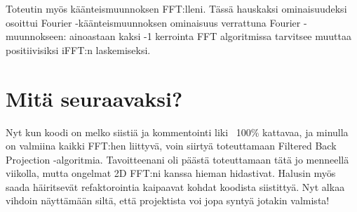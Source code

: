 \documentclass[12pt,a4paper]{report}
\begin{document}
    Toteutin myös käänteismuunnoksen FFT:lleni. Tässä hauskaksi ominaisuudeksi osoittui Fourier -käänteismuunnoksen ominaisuus verrattuna Fourier -muunnokseen: ainoastaan kaksi -1 kerrointa FFT algoritmissa tarvitsee muuttaa positiivisiksi iFFT:n laskemiseksi.
    
    
    \section*{Mitä seuraavaksi?}
    Nyt kun koodi on melko siistiä ja kommentointi liki ~100\% kattavaa, ja minulla on valmiina kaikki FFT:hen liittyvä, voin siirtyä toteuttamaan Filtered Back Projection -algoritmia. Tavoitteenani oli päästä toteuttamaan tätä jo menneellä viikolla, mutta ongelmat 2D FFT:ni kanssa hieman hidastivat. Halusin myös saada häiritsevät refaktorointia kaipaavat kohdat koodista siistittyä. Nyt alkaa vihdoin näyttämään siltä, että projektista voi jopa syntyä jotakin valmista!
     
\end{document}
